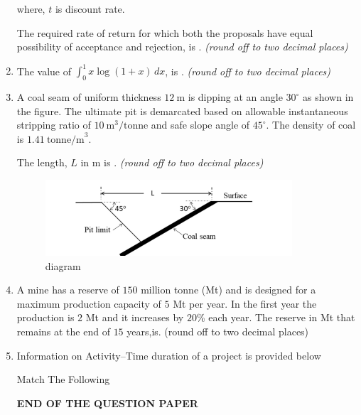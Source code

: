 \documentclass[journal,12pt,onecolumn]{IEEEtran}
\theoremstyle{remark}
\begin{document}
\begin{enumerate}
where, $t$ is discount rate.  

The required rate of return for which both the proposals have equal possibility of acceptance and rejection, is \underline{\hspace{1.5cm}}.  
\textit{(round off to two decimal places)}


\hfill{}
\item The value of $\int_{0}^{1} x \log (1+x) \, dx$, is \underline{\hspace{1.5cm}}.  
\textit{(round off to two decimal places)}  

\hfill{}

\item A coal seam of uniform thickness $12 \ \text{m}$ is dipping at an angle $30^\circ$ as shown in the figure.  
The ultimate pit is demarcated based on allowable instantaneous stripping ratio of $10 \ \text{m}^3/\text{tonne}$ and safe slope angle of $45^\circ$.  
The density of coal is $1.41 \ \text{tonne/m}^3$.  

The length, $L$ in m is \underline{\hspace{1.5cm}}.  
\textit{(round off to two decimal places)} 
\begin{figure}[H]
  \centering
  \includegraphics[width=0.4\columnwidth]{figs/pit.png}
  \caption{diagram}
  \label{fig:pit}
\end{figure}

\hfill{}
\item A mine has a reserve of $150$ million tonne (Mt) and is designed for a maximum production capacity of $5$ Mt per year. In the first year the production is $2$ Mt and it increases by $20$\% each year. The reserve in Mt that remains at the end of $15$ years,is. (round off to two decimal places)

\hfill{}
\item Information on Activity--Time duration of a project is provided below  
\begin{table}[H]
  \centering
  \caption{Match The Following}
  
  \label{tab:table10}
\end{table}


\hfill{}
\begin{center}
\Large\textbf{{END OF THE QUESTION PAPER}}
\end{center}
\end{enumerate}
\end{document}
